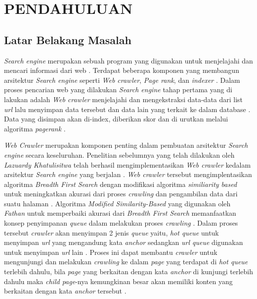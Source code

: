 

\chapter{PENDAHULUAN}

\section{Latar Belakang Masalah}

\emph{Search engine} merupakan sebuah program yang digunakan untuk menjelajahi dan mencari informasi dari web \citep{seymour2011history}. Terdapat beberapa komponen yang membangun arsitektur \emph{Search engine} seperti \emph{Web crawler}, \emph{Page rank}, dan \emph{indexer} \citep{brin1998anatomy}. Dalam proses pencarian web yang dilakukan \emph{Search engine} tahap pertama yang di lakukan adalah \emph{Web crawler} menjelajahi dan mengekstraksi data-data dari list \emph{url} lalu menyimpan data tersebut dan data lain yang terkait ke dalam database \citep{brin1998anatomy}. Data yang disimpan akan di-index, diberikan skor dan di urutkan melalui algoritma \emph{pagerank} \citep{brin1998anatomy}.

\emph{Web Crawler} merupakan komponen penting dalam pembuatan arsitektur \emph{Search engine} secara keseluruhan. Penelitian sebelumnya yang telah dilakukan oleh \emph{Lazuardy Khatulisitwa} telah berhasil mengimplementasikan \emph{Web crawler} kedalam arsitektur \emph{Search engine} yang berjalan \citep{lazuardithesis}. \emph{Web crawler} tersebut mengimplentasikan algoritma \emph{Breadth First Search} dengan modifikasi algoritma \emph{similiarity based} untuk meningkatkan akurasi dari proses \emph{crawling} dan pengambilan data dari  suatu halaman \citep{lazuardithesis}. Algoritma \emph{Modified Similarity-Based} yang digunakan oleh \emph{Fathan} untuk memperbaiki akurasi dari \emph{Breadth First Search} memanfaatkan konsep penyimpanan \emph{queue} dalam melakukan proses \emph{crawling} \citep{fathanthesis} . Dalam proses tersebut \emph{crawler} akan menyimpan 2 jenis \emph{queue} yaitu, \emph{hot queue} untuk menyimpan \emph{url} yang mengandung kata \emph{anchor} sedangkan \emph{url queue} digunakan untuk menyimpan \emph{url} lain \citep{cho1998efficient}. Proses ini dapat membantu \emph{crawler} untuk mengunjungi dan melakukan \emph{crawling} ke dalam \emph{page} yang terdapat di \emph{hot queue} terlebih dahulu, bila \emph{page} yang berkaitan dengan kata \emph{anchor} di kunjungi terlebih dahulu maka \emph{child page}-nya kemungkinan besar akan memiliki konten yang berkaitan dengan kata \emph{anchor} tersebut \citep{cho1998efficient}. 

